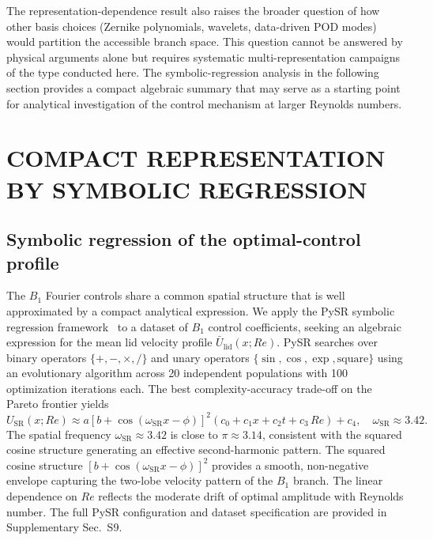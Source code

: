 \documentclass[a4paper,11pt]{article}
\begin{document}
The representation-dependence result also raises the broader question of how other
basis choices (Zernike polynomials, wavelets, data-driven POD modes) would partition
the accessible branch space. This question cannot be answered by physical arguments
alone but requires systematic multi-representation campaigns of the type conducted
here. The symbolic-regression analysis in the following section provides a compact
algebraic summary that may serve as a starting point for analytical investigation
of the control mechanism at larger Reynolds numbers.

\section{COMPACT REPRESENTATION BY SYMBOLIC REGRESSION}
\label{sec:sr}

\subsection{Symbolic regression of the optimal-control profile}

The \(B_1\) Fourier controls share a common spatial structure that is well
approximated by a compact analytical expression. We apply the PySR symbolic
regression framework~\cite{cranmer2023pysr} to a dataset of \(B_1\) control
coefficients, seeking an algebraic expression for the mean lid velocity profile
\(\bar U_{\mathrm{lid}}(x;Re)\). PySR searches over binary operators
\(\{+,-,\times,/\}\) and unary operators \(\{\sin,\cos,\exp,\mathrm{square}\}\)
using an evolutionary algorithm across 20 independent populations with 100
optimization iterations each. The best complexity-accuracy trade-off on the
Pareto frontier yields
\begin{equation}
U_{\mathrm{SR}}(x;Re)\approx
a\left[b+\cos(\omega_{\mathrm{SR}}x-\phi)\right]^2
(c_0+c_1 x+c_2 t+c_3\,Re)+c_4,
\quad\omega_{\mathrm{SR}}\approx 3.42.
\label{eq:sr}
\end{equation}
The spatial frequency \(\omega_{\mathrm{SR}}\approx3.42\) is close to \(\pi\approx3.14\),
consistent with the squared cosine structure generating an effective second-harmonic
pattern. The squared cosine structure \([b+\cos(\omega_{\mathrm{SR}}x-\phi)]^2\)
provides a smooth, non-negative envelope capturing the two-lobe velocity pattern
of the \(B_1\) branch. The linear dependence on \(Re\) reflects the moderate drift
of optimal amplitude with Reynolds number. The full PySR configuration and dataset
specification are provided in Supplementary Sec.~S9.
\end{document}
